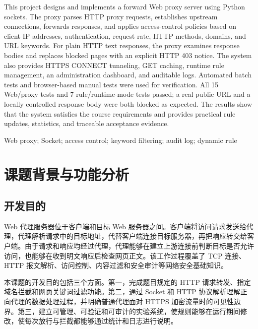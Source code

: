 \documentclass[UTF8,a4paper,10.5pt,fontset=windows]{ctexart}
\begin{document}
\vspace{0.6em}
{
This project designs and implements a forward Web proxy server using Python sockets. The proxy parses HTTP proxy requests, establishes upstream connections, forwards responses, and applies access-control policies based on client IP addresses, authentication, request rate, HTTP methods, domains, and URL keywords. For plain HTTP text responses, the proxy examines response bodies and replaces blocked pages with an explicit HTTP 403 notice. The system also provides HTTPS CONNECT tunneling, GET caching, runtime rule management, an administration dashboard, and auditable logs. Automated batch tests and browser-based manual tests were used for verification. All 15 Web/proxy tests and 7 rule/runtime-mode tests passed; a real public URL and a locally controlled response body were both blocked as expected. The results show that the system satisfies the course requirements and provides practical rule updates, statistics, and traceable acceptance evidence.}

\vspace{0.5em}
{ Web proxy; Socket; access control; keyword filtering; audit log; dynamic rule}

\clearpage
\tableofcontents
\clearpage

\section{课题背景与功能分析}

\subsection{开发目的}

Web 代理服务器位于客户端和目标 Web 服务器之间。客户端将访问请求发送给代理，代理解析请求中的目标地址，代替客户端连接目标服务器，再把响应转交给客户端。由于请求和响应均经过代理，代理能够在建立上游连接前判断目标是否允许访问，也能够在收到明文响应后检查网页正文。该工作过程覆盖了 TCP 连接、HTTP 报文解析、访问控制、内容过滤和安全审计等网络安全基础知识。

本课题的开发目的包括三个方面。第一，完成题目规定的 HTTP 请求转发、指定域名拦截和网页关键词过滤功能。第二，通过 Socket 和 HTTP 协议解析理解正向代理的数据处理过程，并明确普通代理面对 HTTPS 加密流量时的可见性边界。第三，建立可管理、可验证和可审计的实验系统，使规则能够在运行期间修改，使每次放行与拦截都能够通过统计和日志进行说明。
\end{document}
